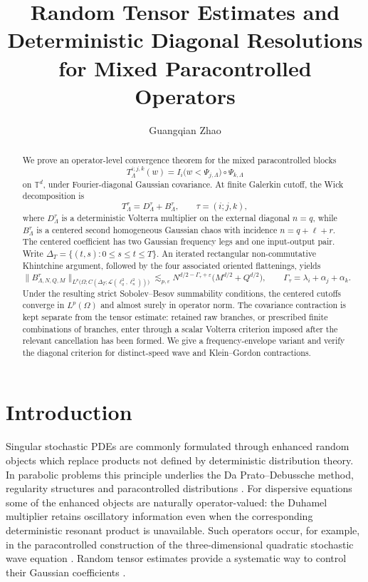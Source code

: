 \documentclass[11pt,reqno]{amsart}
\title[Random Tensor Estimates]
{Random Tensor Estimates and Deterministic Diagonal Resolutions for Mixed Paracontrolled Operators}
\author{Guangqian Zhao}
\date{}
\numberwithin{equation}{section}
\theoremstyle{plain}
\theoremstyle{definition}
\begin{document}
\begin{abstract}
We prove an operator-level convergence theorem for the mixed paracontrolled
blocks
\[
  T^{i;j,k}_{\Lambda}(w)
  =I_i\bigl(w<\Psi_{j,\Lambda}\bigr)\circ\Psi_{k,\Lambda}
\]
on \(\mathbb T^d\), under Fourier-diagonal Gaussian covariance.  At finite
Galerkin cutoff, the Wick decomposition is
\[
  T^\tau_\Lambda=D^\tau_\Lambda+B^\tau_\Lambda,
  \qquad \tau=(i;j,k),
\]
where \(D^\tau_\Lambda\) is a deterministic Volterra multiplier on the
external diagonal \(n=q\), while \(B^\tau_\Lambda\) is a centered second
homogeneous Gaussian chaos with incidence \(n=q+\ell+r\).  The centered
coefficient has two Gaussian frequency legs and one input-output pair.  Write
\(\Delta_T=\{(t,s):0\le s\le t\le T\}\).  An iterated rectangular non-commutative Khintchine argument, followed by the
four associated oriented flattenings, yields
\[
  \bigl\|B^\tau_{\Lambda,N,Q,M}\bigr\|_
  {L^p\bigl(\Omega;C(\Delta_T;\mathcal L(\ell_q^2,\ell_n^2))\bigr)}
  \lesssim_{p,\varepsilon}
  N^{d/2-\Gamma_\tau+\varepsilon}
  \bigl(M^{d/2}+Q^{d/2}\bigr),
  \qquad
  \Gamma_\tau=\lambda_i+\alpha_j+\alpha_k.
\]
Under the resulting strict Sobolev--Besov summability conditions, the
centered cutoffs converge in \(L^p(\Omega)\) and almost surely in operator
norm.  The covariance contraction is kept separate from the tensor
estimate: retained raw branches, or prescribed finite combinations of
branches, enter through a scalar Volterra criterion imposed after the
relevant cancellation has been formed.  We give a frequency-envelope
variant and verify the diagonal criterion for distinct-speed wave and
Klein--Gordon contractions.
\end{abstract}

\maketitle

\section{Introduction}\label{sec:intro}

Singular stochastic PDEs are commonly formulated through enhanced random
objects which replace products not defined by deterministic distribution
theory.  In parabolic problems this principle underlies the Da
Prato--Debussche method, regularity structures and paracontrolled
distributions \cite{DaPratoDebussche,Hairer,GIP}.  For dispersive equations
some of the enhanced objects are naturally operator-valued: the Duhamel
multiplier retains oscillatory information even when the corresponding
deterministic resonant product is unavailable.  Such operators occur, for
example, in the paracontrolled construction of the three-dimensional
quadratic stochastic wave equation \cite{GKO}.  Random tensor estimates
provide a systematic way to control their Gaussian coefficients
\cite{DNYTensor,Kaneshiro}.
\end{document}
